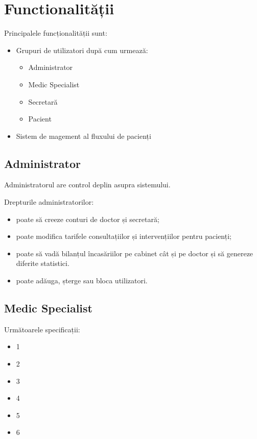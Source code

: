 \documentclass[a4paper,12pt]{article}
\begin{document}
\section{Functionalității}

Principalele funcționalității sunt:
\begin{itemize}
\item Grupuri de utilizatori după cum urmează:
\begin{itemize}
\item Administrator
\item Medic Specialist
\item Secretară
\item Pacient
\end{itemize}
\item Sistem de magement al fluxului de pacienți
\end{itemize}

\subsection{Administrator}

Administratorul are control deplin asupra sistemului.

Drepturile administratorilor:

\begin{itemize}
\item  poate să creeze conturi de doctor și secretară;
\item poate modifica tarifele consultațiilor și intervențiilor pentru pacienți;
\item poate să vadă bilanțul încasăriilor pe cabinet cât și pe doctor și să genereze diferite statistici.
\item poate adăuga, șterge sau bloca utilizatori.
\end{itemize}

\subsection{Medic Specialist}

Următoarele specificații:

\begin{itemize}
\item 1
\item 2
\item 3
\item 4
\item 5
\item 6
\end{itemize}
\end{document}

